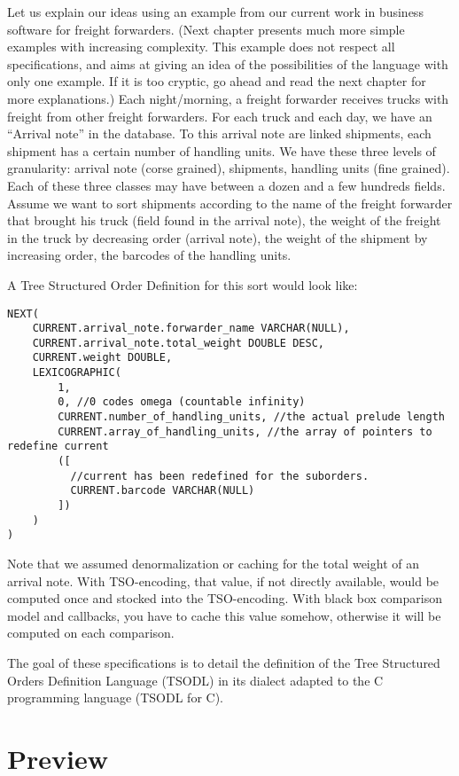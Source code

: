 \documentclass[a4paper,11pt]{report}
\begin{document}
Let us explain our ideas using an example from our current work in business software for freight forwarders.
(Next chapter presents much more simple examples with increasing complexity.
This example does not respect all specifications,
and aims at giving an idea of the possibilities of the language with only one example.
If it is too cryptic, go ahead and read the next chapter for more explanations.)
Each night/morning, a freight forwarder receives trucks with freight from other freight forwarders.
For each truck and each day, we have an ``Arrival note'' in the database.
To this arrival note are linked shipments, each shipment has a certain number of handling units.
We have these three levels of granularity: arrival note (corse grained), shipments, handling units (fine grained).
Each of these three classes may have between a dozen and a few hundreds fields.
Assume we want to sort shipments according to the name of the freight forwarder that brought his truck (field found in the arrival note),
the weight of the freight in the truck by decreasing order (arrival note), the weight of the shipment by increasing order,
 the barcodes of the handling units.

A Tree Structured Order Definition for this sort would look like:
\begin{verbatim}
NEXT(
    CURRENT.arrival_note.forwarder_name VARCHAR(NULL),
    CURRENT.arrival_note.total_weight DOUBLE DESC,
    CURRENT.weight DOUBLE,
    LEXICOGRAPHIC(
        1,
        0, //0 codes omega (countable infinity)
        CURRENT.number_of_handling_units, //the actual prelude length
        CURRENT.array_of_handling_units, //the array of pointers to redefine current
        ([
          //current has been redefined for the suborders.
          CURRENT.barcode VARCHAR(NULL)
        ])
    )
)
\end{verbatim}

Note that we assumed denormalization or caching for the total weight of an arrival note.
With TSO-encoding, that value, if not directly available, would be computed once and stocked into the TSO-encoding.
With black box comparison model and callbacks, you have to cache this value somehow,
otherwise it will be computed on each comparison.

The goal of these specifications is to detail the definition
of the Tree Structured Orders Definition Language (TSODL)
in its dialect adapted to the C programming language (TSODL for C).

\chapter{Preview}
\label{chapter:preview}
\end{document}
